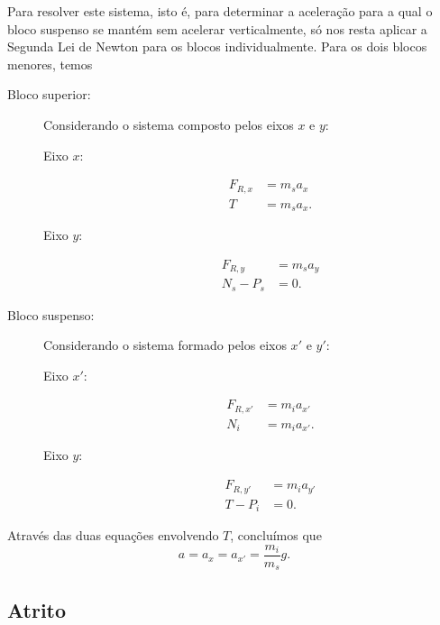 Para resolver este sistema, isto é, para determinar a aceleração para a qual o bloco suspenso se mantém sem acelerar verticalmente, só nos resta aplicar a Segunda Lei de Newton para os blocos individualmente. Para os dois blocos menores, temos
\begin{description}
    \item[Bloco superior:] Considerando o sistema composto pelos eixos $x$ e $y$:
        \begin{description}
            \item[Eixo $x$:]
                \begin{align}
                    F_{R, x} &= m_s a_x \\
                    T &= m_s a_x.
                \end{align}
            \item[Eixo $y$:]
                \begin{align}
                    F_{R, y} &= m_s a_y \\
                    N_s - P_s &= 0.
                \end{align}
        \end{description}
    \item[Bloco suspenso:] Considerando o sistema formado pelos eixos $x'$ e $y'$:
        \begin{description}
            \item[Eixo $x'$:]
                \begin{align}
                    F_{R,x'} &= m_i a_{x'} \\
                    N_i &= m_i a_{x'}.
                \end{align}
            \item[Eixo $y$:]
                \begin{align}
                    F_{R,y'} &= m_i a_{y'} \\
                    T - P_i &= 0.
                \end{align}
        \end{description}
\end{description}
%
Através das duas equações envolvendo $T$, concluímos que
\begin{equation}
    a = a_x = a_{x'}= \frac{m_i}{m_s} g.
\end{equation}

\subsection{Atrito}
\label{Sec:Atrito}

